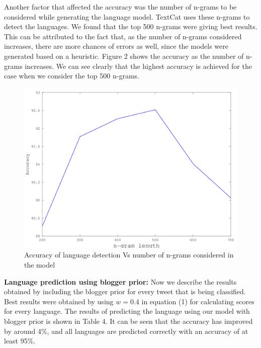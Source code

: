 \documentclass[11pt]{article}
\begin{document}
Another factor that affected the accuracy was the number of n-grams to be considered while generating the language model. TextCat uses these n-grams to detect the languages. We found that the top 500 n-grams were giving best results. This can be attributed to the fact that, as the number of n-grams considered increases, there are more chances of errors as well, since the models were generated based on a heuristic. Figure 2 shows the accuracy as the number of n-grams increases. We can see clearly that the highest accuracy is achieved for the case when we consider the top 500 n-grams.

\begin{figure}[ht]
\includegraphics[scale=0.35]{ngramVsAccuracy.png}
\caption{\footnotesize Accuracy of language detection Vs number of n-grams considered in the model}
\label{fig:s3}
\end{figure}


{\textbf {Language prediction using blogger prior: }} Now we describe the results obtained by including the blogger prior for every tweet that is being classified. Best results were obtained by using $w = 0.4$ in equation (1) for calculating scores for every language. The results of predicting the language using our model with blogger prior is shown in Table 4. It can be seen that the accuracy has improved by around 4\%, and all languages are predicted correctly with an accuracy of at least 95\%.
\end{document}
